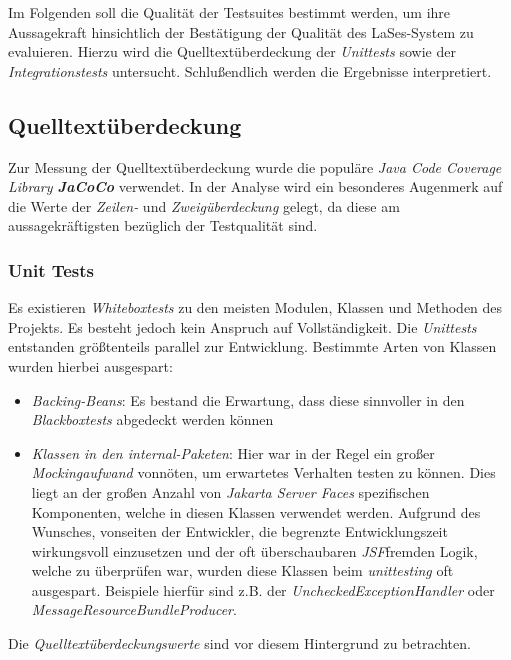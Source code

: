 
Im Folgenden soll die Qualität der Testsuites bestimmt werden,
um ihre Aussagekraft hinsichtlich der Bestätigung der Qualität des LaSes-System zu evaluieren.
Hierzu wird die Quelltextüberdeckung der \emph{Unittests} sowie der \emph{Integrationstests} untersucht.
Schlußendlich werden die Ergebnisse interpretiert.

\subsection{Quelltextüberdeckung}\label{subsec:quelltextueberdeckung}
Zur Messung der Quelltextüberdeckung wurde die populäre \emph{Java Code Coverage Library \textbf{JaCoCo}} verwendet.
In der Analyse wird ein besonderes Augenmerk auf die Werte der \emph{Zeilen-} und \emph{Zweigüberdeckung} gelegt,
da diese am aussagekräftigsten bezüglich der Testqualität sind.

\subsubsection{Unit Tests}
Es existieren \emph{Whiteboxtests} zu den meisten Modulen, Klassen und Methoden des Projekts.
Es besteht jedoch kein Anspruch auf Vollständigkeit.
Die \emph{Unittests} entstanden größtenteils parallel zur Entwicklung.
Bestimmte Arten von Klassen wurden hierbei ausgespart:

\begin{itemize}
    \item \emph{Backing-Beans}: Es bestand die Erwartung, dass diese sinnvoller in den \emph{Blackboxtests}
    abgedeckt werden können
    \item \emph{Klassen in den internal-Paketen}: Hier war in der Regel ein großer \emph{Mockingaufwand} vonnöten,
    um erwartetes Verhalten testen zu können.
    Dies liegt an der großen Anzahl von \emph{Jakarta Server Faces} spezifischen Komponenten,
    welche in diesen Klassen verwendet werden.
    Aufgrund des Wunsches, vonseiten der Entwickler, die begrenzte Entwicklungszeit
    wirkungsvoll einzusetzen und der oft überschaubaren \emph{JSF}\-fremden Logik, welche zu überprüfen war,
    wurden diese Klassen beim \emph{unittesting} oft ausgespart.
    Beispiele hierfür sind z.B. der \emph{UncheckedExceptionHandler} oder \emph{MessageResourceBundleProducer}.
\end{itemize}
Die \emph{Quelltextüberdeckungswerte} sind vor diesem Hintergrund zu betrachten.

